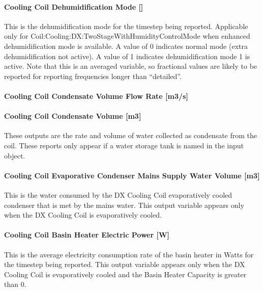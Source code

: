 \paragraph{Cooling Coil Dehumidification Mode {[]}}\label{cooling-coil-dehumidification-mode}

This is the dehumidification mode for the timestep being reported. Applicable only for Coil:Cooling:DX:TwoStageWithHumidityControlMode when enhanced dehumidification mode is available. A value of 0 indicates normal mode (extra dehumidification not active). A value of 1 indicates dehumidification mode 1 is active. Note that this is an averaged variable, so fractional values are likely to be reported for reporting frequencies longer than ``detailed''.

\paragraph{Cooling Coil Condensate Volume Flow Rate {[}m3/s{]}}\label{cooling-coil-condensate-volume-flow-rate-m3s-4}

\paragraph{Cooling Coil Condensate Volume {[}m3{]}}\label{cooling-coil-condensate-volume-m3-4}

These outputs are the rate and volume of water collected as condensate from the coil. These reports only appear if a water storage tank is named in the input object.

\paragraph{Cooling Coil Evaporative Condenser Mains Supply Water Volume {[}m3{]}}\label{cooling-coil-evaporative-condenser-mains-supply-water-volume-m3-1}

This is the water consumed by the DX Cooling Coil evaporatively cooled condenser that is met by the mains water. This output variable appears only when the DX Cooling Coil is evaporatively cooled.

\paragraph{Cooling Coil Basin Heater Electric Power {[}W{]}}\label{cooling-coil-basin-heater-electric-power-w}

This is the average electricity consumption rate of the basin heater in Watts for the timestep being reported. This output variable appears only when the DX Cooling Coil is evaporatively cooled and the Basin Heater Capacity is greater than 0.

